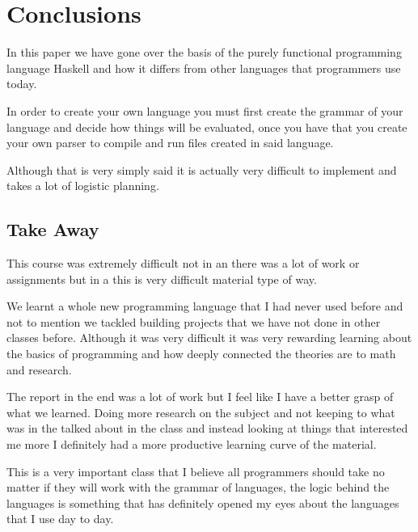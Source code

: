 \documentclass{article}
\begin{document}
\section{Conclusions}\label{conclusions}
In this paper we have gone over the basis of the purely functional programming language Haskell and how it differs from other languages that programmers use today. 

\medskip\noindent
In order to create your own language you must first create the grammar of your language and decide how things will be evaluated, once you have that you create your own parser to compile and run files created in said language.

\medskip\noindent
Although that is very simply said it is actually very difficult to implement and takes a lot of logistic planning.

\subsection{Take Away}
This course was extremely difficult not in an there was a lot of work or assignments but in a this is very difficult material type of way.

\medskip\noindent 
We learnt a whole new programming language that I had never used before and not to mention we tackled building projects that we have not done in other classes before. Although it was very difficult it was very rewarding learning about the basics of programming and how deeply connected the theories are to math and research. 

\medskip\noindent 
The report in the end was a lot of work but I feel like I have a better grasp of what we learned. Doing more research on the subject and not keeping to what was in the talked about in the class and instead looking at things that interested me more I definitely had a more productive learning curve of the material.

\medskip\noindent 
This is a very important class that I believe all programmers should take no matter if they will work with the grammar of languages, the logic behind the languages is something that has definitely opened my eyes about the languages that I use day to day.
\end{document}
